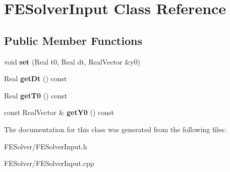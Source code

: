 \hypertarget{classFESolverInput}{
\section{FESolverInput Class Reference}
\label{classFESolverInput}
}
\subsection*{Public Member Functions}
\begin{DoxyCompactItemize}
\item 
\hypertarget{classFESolverInput_a88ad8d5ea0ba74e1b83e1ef7ed3350fc}{
void {\bfseries set} (Real t0, Real dt, RealVector \&y0)}
\label{classFESolverInput_a88ad8d5ea0ba74e1b83e1ef7ed3350fc}

\item 
\hypertarget{classFESolverInput_ab86ff7eea7fca1e7ad6a02848a4b34e0}{
Real {\bfseries getDt} () const }
\label{classFESolverInput_ab86ff7eea7fca1e7ad6a02848a4b34e0}

\item 
\hypertarget{classFESolverInput_a0c71112b0a658da15e04ec636cc31acc}{
Real {\bfseries getT0} () const }
\label{classFESolverInput_a0c71112b0a658da15e04ec636cc31acc}

\item 
\hypertarget{classFESolverInput_aa5765164c5aa548129d84cd1bf3446d7}{
const RealVector \& {\bfseries getY0} () const }
\label{classFESolverInput_aa5765164c5aa548129d84cd1bf3446d7}

\end{DoxyCompactItemize}


The documentation for this class was generated from the following files:\begin{DoxyCompactItemize}
\item 
FESolver/FESolverInput.h\item 
FESolver/FESolverInput.cpp\end{DoxyCompactItemize}
